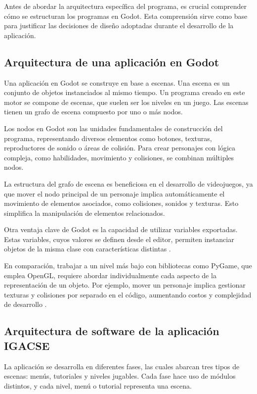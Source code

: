 Antes de abordar la arquitectura específica del programa, es crucial comprender cómo se estructuran los programas en Godot. Esta comprensión sirve como base para justificar las decisiones de diseño adoptadas durante el desarrollo de la aplicación.

\subsection{Arquitectura de una aplicación en Godot}

Una aplicación en Godot se construye en base a escenas. Una escena es un conjunto de objetos instanciados al mismo tiempo. Un programa creado en este motor se compone de escenas, que suelen ser los niveles en un juego. Las escenas tienen un grafo de escena compuesto por uno o más nodos.

Los nodos en Godot son las unidades fundamentales de construcción del programa, representando diversos elementos como botones, texturas, reproductores de sonido o áreas de colisión. Para crear personajes con lógica compleja, como habilidades, movimiento y colisiones, se combinan múltiples nodos.

La estructura del grafo de escena es beneficiosa en el desarrollo de videojuegos, ya que mover el nodo principal de un personaje implica automáticamente el movimiento de elementos asociados, como colisiones, sonidos y texturas. Esto simplifica la manipulación de elementos relacionados.

Otra ventaja clave de Godot es la capacidad de utilizar variables exportadas. Estas variables, cuyos valores se definen desde el editor, permiten instanciar objetos de la misma clase con características distintas \cite{GodotExportVariables}.

En comparación, trabajar a un nivel más bajo con bibliotecas como PyGame, que emplea OpenGL, requiere abordar individualmente cada aspecto de la representación de un objeto. Por ejemplo, mover un personaje implica gestionar texturas y colisiones por separado en el código, aumentando costos y complejidad de desarrollo \cite{GodotCollisionsAndRendering}.

\subsection{Arquitectura de software de la aplicación IGACSE}

La aplicación se desarrolla en diferentes fases, las cuales abarcan tres tipos de escenas: menús, tutoriales y niveles jugables. Cada fase hace uso de módulos distintos, y cada nivel, menú o tutorial representa una escena.

